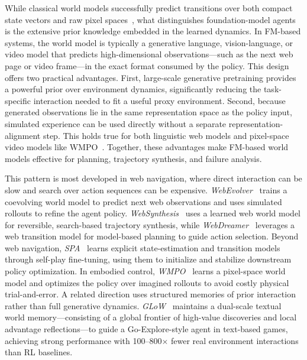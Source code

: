 While classical world models successfully predict transitions over both compact state vectors and raw pixel spaces~\citep{ha2018world}, what distinguishes foundation-model agents is the extensive prior knowledge embedded in the learned dynamics. In FM-based systems, the world model is typically a generative language, vision-language, or video model that predicts high-dimensional observations—such as the next web page or video frame—in the exact format consumed by the policy. This design offers two practical advantages. First, large-scale generative pretraining provides a powerful prior over environment dynamics, significantly reducing the task-specific interaction needed to fit a useful proxy environment. Second, because generated observations lie in the same representation space as the policy input, simulated experience can be used directly without a separate representation-alignment step. This holds true for both linguistic web models and pixel-space video models like WMPO~\citep{zhu2025wmpoworldmodelbasedpolicy}. Together, these advantages make FM-based world models effective for planning, trajectory synthesis, and failure analysis.


This pattern is most developed in web navigation, where direct interaction can be slow and search over action sequences can be expensive. \textit{WebEvolver}~\citep{fang2025webevolver} trains a coevolving world model to predict next web observations and uses simulated rollouts to refine the agent policy. \textit{WebSynthesis}~\citep{gao2025websynthesisworldmodelguidedmctsefficient} uses a learned web world model for reversible, search-based trajectory synthesis, while \textit{WebDreamer}~\citep{gu2025is} leverages a web transition model for model-based planning to guide action selection. Beyond web navigation, \textit{SPA}~\citep{chen2025internalizingworldmodelsselfplay} learns explicit state-estimation and transition models through self-play fine-tuning, using them to initialize and stabilize downstream policy optimization. In embodied control, \textit{WMPO}~\citep{zhu2025wmpoworldmodelbasedpolicy} learns a pixel-space world model and optimizes the policy over imagined rollouts to avoid costly physical trial-and-error. A related direction uses structured memories of prior interaction rather than full generative dynamics. \textit{GLoW}~\citep{kim2025dualscaleworldmodelsllm} maintains a dual-scale textual world memory—consisting of a global frontier of high-value discoveries and local advantage reflections—to guide a Go-Explore-style agent in text-based games, achieving strong performance with 100--800$\times$ fewer real environment interactions than RL baselines.



